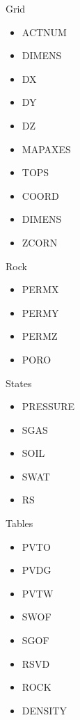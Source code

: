 \documentclass[letterpaper,10pt,english]{sphinxmanual}
\begin{document}
Grid
\begin{itemize}
\item {} 
ACTNUM

\item {} 
DIMENS

\item {} 
DX

\item {} 
DY

\item {} 
DZ

\item {} 
MAPAXES

\item {} 
TOPS

\item {} 
COORD

\item {} 
DIMENS

\item {} 
ZCORN

\end{itemize}

Rock
\begin{itemize}
\item {} 
PERMX

\item {} 
PERMY

\item {} 
PERMZ

\item {} 
PORO

\end{itemize}

States
\begin{itemize}
\item {} 
PRESSURE

\item {} 
SGAS

\item {} 
SOIL

\item {} 
SWAT

\item {} 
RS

\end{itemize}

Tables
\begin{itemize}
\item {} 
PVTO

\item {} 
PVDG

\item {} 
PVTW

\item {} 
SWOF

\item {} 
SGOF

\item {} 
RSVD

\item {} 
ROCK

\item {} 
DENSITY

\end{itemize}
\end{document}
